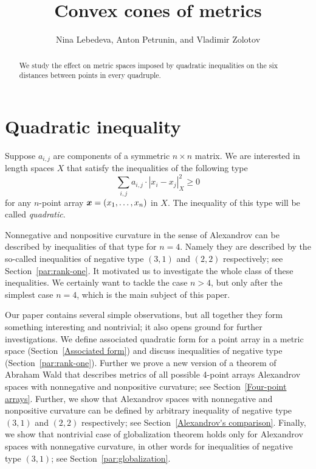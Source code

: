 \documentclass[a4paper,10pt]{article}
\def\thetitle{Convex cones of metrics}
\def\theauthors{Nina Lebedeva, Anton Petrunin, and Vladimir Zolotov}
\begin{document}


\title{\thetitle}
\author{\theauthors}
\date{}
\maketitle

\begin{abstract}
We study the effect on metric spaces imposed by quadratic inequalities on the six distances between points in every quadruple.
\end{abstract}

\section{Quadratic inequality}\label{par:quadratic-inq}

Suppose $a_{i,j}$ are components of a symmetric $n{\times}n$ matrix.
We are interested in length spaces $X$ that
satisfy the inequalities of the following type
\[\sum_{i,j}a_{i,j}\cdot|x_i-x_j|_X^2\ge 0\]
for any $n$-point array $\bm{x}\z=(x_1,\dots,x_n)$ in $X$.
The inequality of this type will be called \emph{quadratic}.


Nonnegative and nonpositive curvature in the sense of Alexandrov can be described by inequalities of that type for $n=4$.
Namely they are described by the so-called inequalities of negative type $(3,1)$ and $(2,2)$ respectively; see Section~\ref{par:rank-one}.
It motivated us to investigate the whole class of these inequalities.
We certainly want to tackle the case $n>4$, but only after the simplest case $n=4$, which is the main subject of this paper.

Our paper contains several simple observations, but all together they form something interesting and nontrivial; it also opens ground for further investigations.
We define associated quadratic form for a point array in a metric space (Section~\ref{Associated form})
and discuss inequalities of negative type (Section~\ref{par:rank-one}).
Further we prove a new version of a theorem of Abraham Wald \cite[§ 7]{wald} that describes metrics of all possible 4-point arrays Alexandrov spaces with nonnegative and nonpositive curvature;
see Section~\ref{Four-point arrays}.
Further, we show that Alexandrov spaces with nonnegative and nonpositive curvature can be defined by arbitrary inequality of negative type $(3,1)$ and $(2,2)$ respectively;
see Section~\ref{Alexandrov's comparison}.
Finally, we show that nontrivial case of globalization theorem holds only for Alexandrov spaces with nonnegative curvature, in other words for inequalities of negative type $(3,1)$;
see Section~\ref{par:globalization}.
\end{document}
